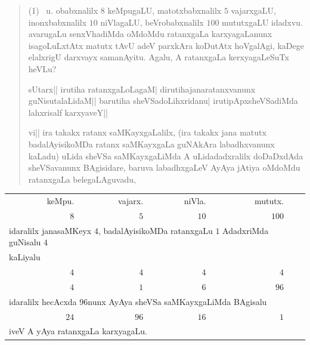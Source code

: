 \begin{verse}
{\rm(1)}~ u. obabxnalilx $8$ keMpugaLU, matotxbabxnalilx $5$
vajarxgaLU, inonxbabxnalilx $10$ niVlagaLU, beVrobabxnalilx $100$
mututxgaLU idadxvu. avarugaLu senxVhadiMda oMdoMdu ratanxgaLa
karxyagaLanunx isagoLuLxtAtx matutx tAvU adeV parxkAra koDutAtx
hoVgalAgi, kaDege elalxrigU darxvayx samanAyitu. Agalu, A ratanxgaLa
kerxyagaLeSuTx heVLu?

sUtarx|| irutiha ratanxgaLoLagaM| dirutihajanaratanxvanunx
guNisutalaLidaM|| barutiha sheVSadoLihxridanu| irutipApxsheVSadiMda
lahxrisalf karxyaveY||

vi|| ira takakx ratanx saMKayxgaLalilx, (ira takakx jana matutx
badalAyisikoMDa ratanx saMKayxgaLa guNAkAra labadhxvanunx kaLadu)
uLida sheVSa saMKayxgaLiMda A uLidadadxralilx doDaDxdAda sheVSavanunx
BAgi\-sidare, baruva labadhxgaLeV AyAya jAtiya oMdoMdu ratanxgaLa
belegaLAguvadu, 
\end{verse}

\begin{center}
\begin{tabular}{rrrrc}
keMpu. & vajarx. & niVla. &  mututx.\\[2pt]
$8$ & $5$ & $10$ & $100$\\
\multicolumn{5}{l}{idaralilx janasaMKeyx $4$, badalAyisikoMDa
ratanxgaLu $1$ AdadxriMda guNisalu $4$}\\[4pt]
\multicolumn{5}{l}{kaLiyalu}\\[4pt]
$4$ & $4$ & $4$ & $4$\\
\cline{1-4}
$4$ & $1$ & $6$ & $96$\\[4pt]
\multicolumn{5}{l}{idaralilx hecAcxda $96$nunx AyAya sheVSa
saMKayxgaLiMda BAgisalu}\\[2pt]
$24$ & $96$ & $16$ & $1$\\[2pt]
\multicolumn{5}{l}{iveV A yAya ratanxgaLa karxyagaLu.}
\end{tabular}
\end{center}


